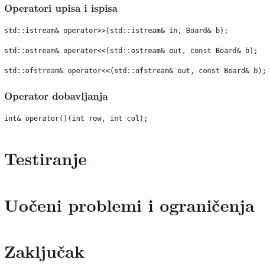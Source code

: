 \documentclass[a4paper]{article}
\begin{document}
    \subsubsection{Operatori upisa i ispisa}
    \par\texttt{std::istream\& operator>>(std::istream\& in, Board\& b);}
    \par\texttt{std::ostream\& operator<<(std::ostream\& out, const Board\& b);}
    \par\texttt{std::ofstream\& operator<<(std::ofstream\& out, const Board\& b);}
    
    \subsubsection{Operator dobavljanja}
    \par\texttt{int\& operator()(int row, int col);}
    
    
    
    \section{Testiranje}
    \newpage
    \section{Uočeni problemi i ograničenja}
    \newpage
    \section{Zaključak}
    \newpage
\end{document}
